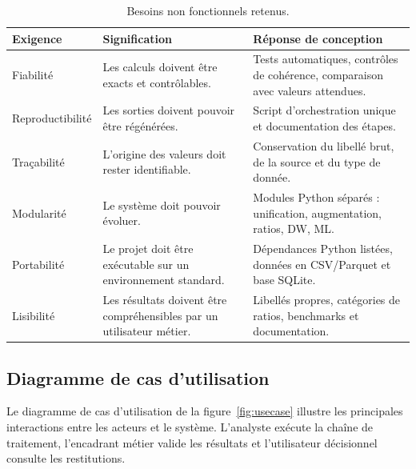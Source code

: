 \begin{table}[H]
\centering
\caption[Besoins non fonctionnels]{Besoins non fonctionnels retenus.}
\label{tab:besoinsnonfonctionnels}
\begin{tabularx}{\linewidth}{|p{3cm}|X|X|}
\hline
\textbf{Exigence} & \textbf{Signification} & \textbf{Réponse de conception} \\ \hline
Fiabilité & Les calculs doivent être exacts et contrôlables. & Tests automatiques, contrôles de cohérence, comparaison avec valeurs attendues. \\ \hline
Reproductibilité & Les sorties doivent pouvoir être régénérées. & Script d'orchestration unique et documentation des étapes. \\ \hline
Traçabilité & L'origine des valeurs doit rester identifiable. & Conservation du libellé brut, de la source et du type de donnée. \\ \hline
Modularité & Le système doit pouvoir évoluer. & Modules Python séparés : unification, augmentation, ratios, DW, ML. \\ \hline
Portabilité & Le projet doit être exécutable sur un environnement standard. & Dépendances Python listées, données en CSV/Parquet et base SQLite. \\ \hline
Lisibilité & Les résultats doivent être compréhensibles par un utilisateur métier. & Libellés propres, catégories de ratios, benchmarks et documentation. \\ \hline
\end{tabularx}
\end{table}

\subsection{Diagramme de cas d'utilisation}
\par Le diagramme de cas d'utilisation de la figure~\ref{fig:usecase} illustre
les principales interactions entre les acteurs et le système. L'analyste exécute
la chaîne de traitement, l'encadrant métier valide les résultats et
l'utilisateur décisionnel consulte les restitutions.

